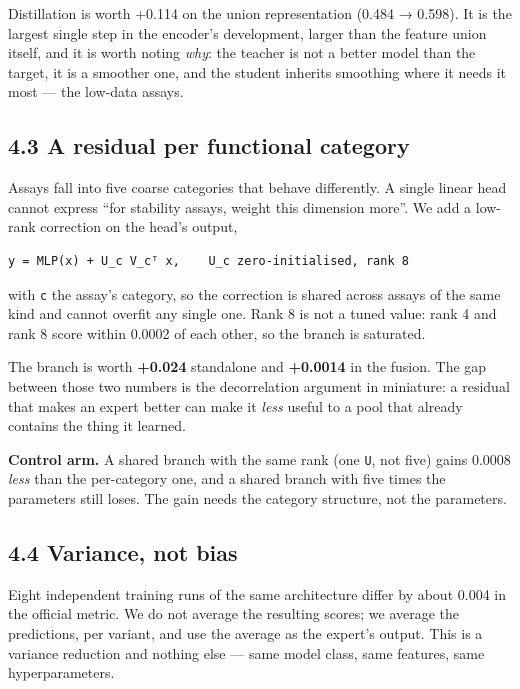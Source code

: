 Distillation is worth +0.114 on the union representation (0.484 → 0.598). It is the largest single step
in the encoder's development, larger than the feature union itself, and it is worth noting \emph{why}: the
teacher is not a better model than the target, it is a smoother one, and the student inherits smoothing
where it needs it most --- the low-data assays.

\hypertarget{a-residual-per-functional-category}{%
\subsection{4.3 A residual per functional category}\label{a-residual-per-functional-category}}

Assays fall into five coarse categories that behave differently. A single linear head cannot express
``for stability assays, weight this dimension more''. We add a low-rank correction on the head's output,

\begin{verbatim}
y = MLP(x) + U_c V_cᵀ x,    U_c zero-initialised, rank 8
\end{verbatim}

with \texttt{c} the assay's category, so the correction is shared across assays of the same kind and cannot
overfit any single one. Rank 8 is not a tuned value: rank 4 and rank 8 score within 0.0002 of each
other, so the branch is saturated.

The branch is worth \textbf{+0.024} standalone and \textbf{+0.0014} in the fusion. The gap between those two
numbers is the decorrelation argument in miniature: a residual that makes an expert better can make it
\emph{less} useful to a pool that already contains the thing it learned.

\textbf{Control arm.} A shared branch with the same rank (one \texttt{U}, not five) gains 0.0008 \emph{less} than the
per-category one, and a shared branch with five times the parameters still loses. The gain needs the
category structure, not the parameters.

\hypertarget{variance-not-bias}{%
\subsection{4.4 Variance, not bias}\label{variance-not-bias}}

Eight independent training runs of the same architecture differ by about 0.004 in the official metric.
We do not average the resulting scores; we average the predictions, per variant, and use the average as
the expert's output. This is a variance reduction and nothing else --- same model class, same features,
same hyperparameters.

